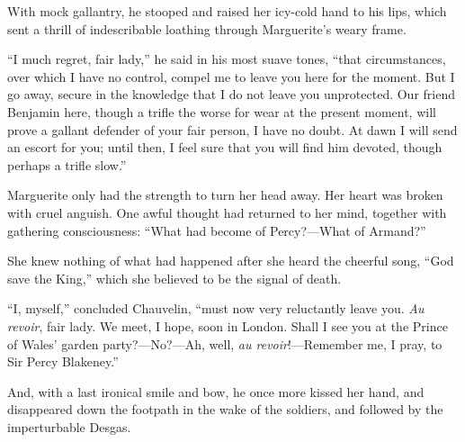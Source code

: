With mock gallantry, he stooped and raised her icy-cold hand to his lips, which sent a thrill of indescribable loathing through Marguerite's weary frame.

\enquote{I much regret, fair lady,} he said in his most suave tones, \enquote{that circumstances, over which I have no control, compel me to leave you here for the moment. But I go away, secure in the knowledge that I do not leave you unprotected. Our friend Benjamin here, though a trifle the worse for wear at the present moment, will prove a gallant defender of your fair person, I have no doubt. At dawn I will send an escort for you; until then, I feel sure that you will find him devoted, though perhaps a trifle slow.}

Marguerite only had the strength to turn her head away. Her heart was broken with cruel anguish. One awful thought had returned to her mind, together with gathering consciousness: \enquote{What had become of Percy?---What of Armand?}

She knew nothing of what had happened after she heard the cheerful song, \enquote{God save the King,} which she believed to be the signal of death.

\enquote{I, myself,} concluded Chauvelin, \enquote{must now very reluctantly leave you. \textit{Au revoir}, fair lady. We meet, I hope, soon in London. Shall I see you at the Prince of Wales’ garden party?---No?---Ah, well, \textit{au revoir}!---Remember me, I pray, to Sir Percy Blakeney.}

And, with a last ironical smile and bow, he once more kissed her hand, and disappeared down the footpath in the wake of the soldiers, and followed by the imperturbable Desgas.